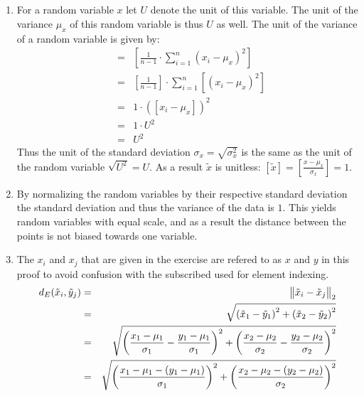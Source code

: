 \documentclass[DIN, pagenumber=false, fontsize=11pt, parskip=half]{scrartcl}
\begin{document}
    \subsection{}
    \begin{enumerate}[label=\alph*)]
        \item For a random variable $x$ let $U$ denote the unit of this variable. The unit of the variance $\mu_x$ of this random variable is thus $U$ as well.
            The unit of the variance of a random variable is given by:
            \begin{eqnarray*}
                [\sigma_x^2] &=& \left[\frac{1}{n-1} \cdot \sum_{i=1}^n {(x_i - \mu_x)}^2\right] \\
                &=& \left[\frac{1}{n-1}\right] \cdot \sum_{i=1}^n \left[{(x_i - \mu_x)}^2\right] \\
                &=& 1 \cdot {([x_i - \mu_x])}^2 \\
                &=& 1 \cdot U^2 \\
                &=& U^2
            \end{eqnarray*}
            Thus the unit of the standard deviation $\sigma_x = \sqrt{\sigma_x^2}$ is the same as the unit of the random variable $\sqrt{U^2} = U$.
            As a result $\tilde{x}$ is unitless: $[\tilde{x}] = [\frac{x - \mu_x}{\sigma_x}] = 1$.
        \item By normalizing the random variables by their respective standard deviation the standard deviation and thus the variance of the data is $1$.
            This yields random variables with equal scale, and as a result the distance between the points is not biased towards one variable.
        \item The $x_i$ and $x_j$ that are given in the exercise are refered to as $x$ and $y$ in this proof to avoid confusion with the subscribed used for element indexing.
            \begin{eqnarray*}
                d_E(\tilde{x}_i, \tilde{y}_j) &=& \norm{\tilde{x}_i - \tilde{x}_j}_2 \\
                    &=& \sqrt{{(\tilde{x}_1 - \tilde{y}_1)}^2 + {(\tilde{x}_2 - \tilde{y}_2)}^2} \\
                    &=& \sqrt{{\left(\frac{x_1 - \mu_1}{\sigma_1} - \frac{y_1 - \mu_1}{\sigma_1}\right)}^2 + {\left(\frac{x_2 - \mu_2}{\sigma_2} - \frac{y_2 - \mu_2}{\sigma_2}\right)}^2} \\
                    &=& \sqrt{{\left(\frac{x_1 - \mu_1 - (y_1 - \mu_1)}{\sigma_1}\right)}^2 + {\left(\frac{x_2 - \mu_2 - (y_2 - \mu_2)}{\sigma_2}\right)}^2} \\

\end{eqnarray*}
\end{enumerate}
\end{document}
